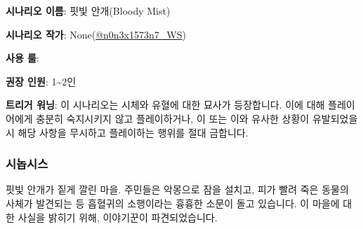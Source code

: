 \documentclass{report}
\begin{document}
	\textbf{시나리오 이름}: 핏빛 안개(Bloody Mist)
	
	\textbf{시나리오 작가}: None(\href{https://www.twitter.com/n0n3x1573n7_WS}{@n0n3x1573n7\_WS})
	
	\textbf{사용 룰}: 
	
	\textbf{권장 인원}: 1\textasciitilde2인
	
	\textbf{트리거 워닝}: 이 시나리오는 시체와 유혈에 대한 묘사가 등장합니다. 이에 대해 플레이어에게 충분히 숙지시키지 않고 플레이하거나, 이 또는 이와 유사한 상황이 유발되었을 시 해당 사항을 무시하고 플레이하는 행위를 절대 금합니다.
	
	\subsubsection*{시놉시스}
	핏빛 안개가 짙게 깔린 마을. 주민들은 악몽으로 잠을 설치고, 피가 빨려 죽은 동물의 사체가 발견되는 등 흡혈귀의 소행이라는 흉흉한 소문이 돌고 있습니다. 이 마을에 대한 사실을 밝히기 위해, 이야기꾼이 파견되었습니다.
\end{document}

